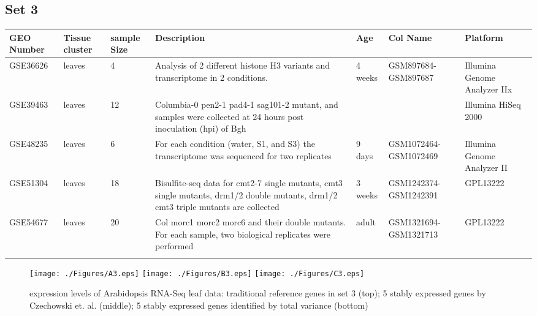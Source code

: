 \documentclass[11pt, a4paper]{article}
\begin{document}
\begin{landscape}
\subsection{Set 3}
\begin{table}
\footnotesize
\centering
\begin{tabular}{p{2cm}p{3cm}p{1cm}p{4cm}p{2.4cm}p{3cm}p{4cm}} \hline
GEO Number &Tissue cluster & sample Size & Description & Age  &Col Name & Platform\\ \hline
GSE36626 &leaves & 4 &Analysis of 2 different histone H3 variants and transcriptome in 2 conditions.  & 4 weeks &GSM897684-GSM897687 & Illumina Genome Analyzer IIx \\ \hdashline
GSE39463 &leaves  &12		&Columbia-0 pen2-1 pad4-1 sag101-2 mutant, and samples were collected at 24 hours post inoculation (hpi) of Bgh & & &Illumina HiSeq 2000 \\ \hdashline
GSE48235 &leaves & 6  & For each condition (water, S1, and S3) the transcriptome was sequenced for two replicates & 9 days & GSM1072464-GSM1072469  &Illumina Genome Analyzer II \\	\hdashline
GSE51304 &leaves  & 18 &Bisulfite-seq data for cmt2-7 single mutants, cmt3 single mutants, drm1/2 double mutants, drm1/2 cmt3 triple mutants are collected  & 3 weeks & GSM1242374-GSM1242391 &GPL13222 \\ \hdashline
GSE54677 & leaves   &20  &Col morc1 morc2 morc6 and their double mutants. For each sample, two biological replicates were performed &adult & GSM1321694-GSM1321713	 &	GPL13222\\ \hdashline
\end{tabular} 
\end{table}
\end{landscape}


 \begin{figure}[H]
\begin{center}
\texttt{[image: ./Figures/A3.eps]}
\texttt{[image: ./Figures/B3.eps]}
\texttt{[image: ./Figures/C3.eps]}
\caption{{\small{\label{sup:expressinlevel} expression levels of Arabidopsis RNA-Seq leaf data: traditional reference genes in set 3 (top)};  5 stably expressed genes by  Czechowski et. al. (middle); 5 stably expressed genes identified by total variance (bottom)}}
\end{center}
\end{figure} 


\end{document}
